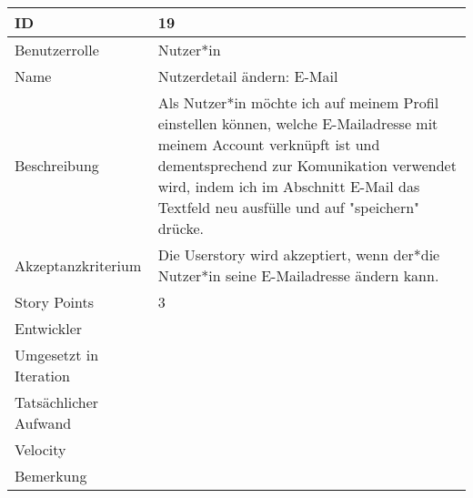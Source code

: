 \begin{tabularx}{\textwidth}{|p{}|X|}
	\hline
	ID & 19\\
	\hline
	Benutzerrolle & Nutzer*in\\
	\hline
	Name & Nutzerdetail ändern: E-Mail\\
	\hline
	Beschreibung & Als Nutzer*in möchte ich auf meinem Profil einstellen können, welche E-Mailadresse mit meinem Account verknüpft ist und dementsprechend zur Komunikation verwendet wird, indem ich im Abschnitt E-Mail das Textfeld neu ausfülle und auf "speichern" drücke.\\
	\hline
	Akzeptanzkriterium & Die Userstory wird akzeptiert, wenn der*die Nutzer*in seine E-Mailadresse ändern kann.\\
	\hline
	Story Points & 3\\
	\hline
	Entwickler & \\
	\hline
	Umgesetzt in Iteration & \\ 
	\hline
	Tatsächlicher Aufwand & \\
	\hline
	Velocity & \\
	\hline
	Bemerkung & \\
	\hline
\end{tabularx}
\vspace{20pt}
